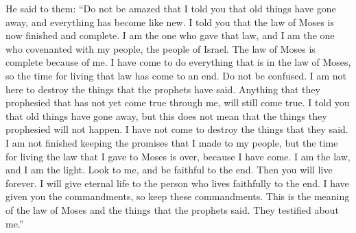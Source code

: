 \bverse \iffalse And he said unto them: Marvel not that I said unto you that old things had passed away, and that all things had become new. \fi
He said to them: ``Do not be amazed that I told you that old things have gone away, and everything has become like new.
\bverse \iffalse Behold, I say unto you that the law is fulfilled that was given unto Moses. \fi
I told you that the law of Moses is now finished and complete.
\bverse \iffalse Behold, I am he that gave the law, and I am he who covenanted with my people Israel; therefore, the law in me is fulfilled, for I have come to fulfil the law; therefore it hath an end. \fi
I am the one who gave that law, and I am the one who covenanted with my people, the people of Israel. The law of Moses is complete because of me. I have come to do everything that is in the law of Moses, so the time for living that law has come to an end.
\bverse \iffalse Behold, I do not destroy the prophets, for as many as have not been fulfilled in me, verily I say unto you, shall all be fulfilled. \fi
Do not be confused. I am not here to destroy the things that the prophets have said. Anything that they prophesied that has not yet come true through me, will still come true.
\bverse \iffalse And because I said unto you that old things have passed away, I do not destroy that which hath been spoken concerning things which are to come. \fi
I told you that old things have gone away, but this does not mean that the things they prophesied will not happen. I have not come to destroy the things that they said.
\bverse \iffalse For behold, the covenant which I have made with my people is not all fulfilled; but the law which was given unto Moses hath an end in me. \fi
I am not finished keeping the promises that I made to my people, but the time for living the law that I gave to Moses is over, because I have come.
\bverse \iffalse Behold, I am the law, and the light. Look unto me, and endure to the end, and ye shall live; for unto him that endureth to the end will I give eternal life. \fi
I am the law, and I am the light. Look to me, and be faithful to the end. Then you will live forever. I will give eternal life to the person who lives faithfully to the end.
\bverse \iffalse Behold, I have given unto you the commandments; therefore keep my commandments. And this is the law and the prophets, for they truly testified of me. \fi
I have given you the commandments, so keep these commandments. This is the meaning of the law of Moses and the things that the prophets said. They testified about me.''
